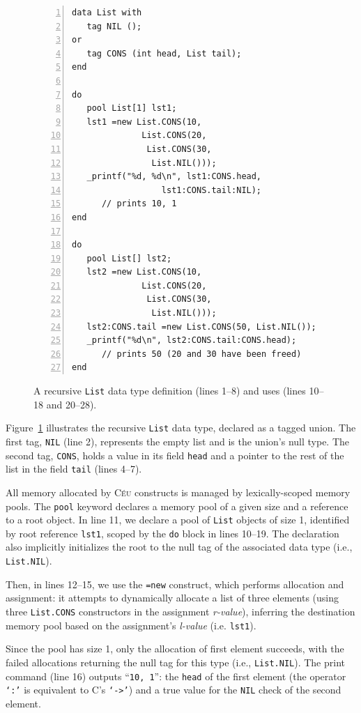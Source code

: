 \documentclass{sig-alternate}
\newcommand{\CEU}{\textsc{C\'{e}u}\xspace}
\newcommand{\code}[1] {{\small{\texttt{#1}}}}
\begin{document}
\begin{figure}[t]
\begin{lstlisting}[numbers=left,xleftmargin=3em]
data List with
   tag NIL ();
or
   tag CONS (int head, List tail);
end

do
   pool List[1] lst1;
   lst1 =new List.CONS(10,
              List.CONS(20,
               List.CONS(30,
                List.NIL()));
   _printf("%d, %d\n", lst1:CONS.head,
                  lst1:CONS.tail:NIL);
      // prints 10, 1
end

do
   pool List[] lst2;
   lst2 =new List.CONS(10,
              List.CONS(20,
               List.CONS(30,
                List.NIL()));
   lst2:CONS.tail =new List.CONS(50, List.NIL());
   _printf("%d\n", lst2:CONS.tail:CONS.head);
      // prints 50 (20 and 30 have been freed)
end
\end{lstlisting}
\caption{
A recursive \code{List} data type definition (lines 1--8) and uses (lines 
10--18 and 20--28).
\label{lst.list}
}
\end{figure}

Figure~\ref{lst.list} illustrates the recursive \code{List} data type,
declared as a tagged union. The first tag, \code{NIL} (line 2), represents
the empty list and is the union's null type. The second tag, \code{CONS},
holds a value in its field \code{head} and a pointer to the rest of the list
in the field \code{tail} (lines 4--7).

All memory allocated by \CEU constructs is managed by lexically-scoped memory
pools. The \code{pool} keyword declares a memory pool of a given size and
a reference to a root object. In line 11, we declare a pool of \code{List}
objects of size 1, identified by root reference \code{lst1},
scoped by the \code{do} block in lines 10--19.
The declaration also implicitly initializes the root to the null tag of the 
associated data type (i.e., \code{List.NIL}).

Then, in lines 12--15, we use the \code{=new} construct, which performs
allocation and assignment: it attempts to dynamically allocate a list of
three elements (using three \code{List.CONS} constructors in the assignment
\emph{r-value}), inferring the destination memory pool based on the 
assignment's \emph{l-value} (i.e. \code{lst1}).

Since the pool has size 1, only the allocation of first element succeeds, with the failed 
allocations returning the null tag for this type (i.e., \code{List.NIL}).
The print command (line 16) outputs ``\texttt{10, 1}'': the \code{head} of the 
first element (the operator \code{`:'} is equivalent to C's \code{`->'}) and 
a true value for the \code{NIL} check of the second element.
\end{document}
